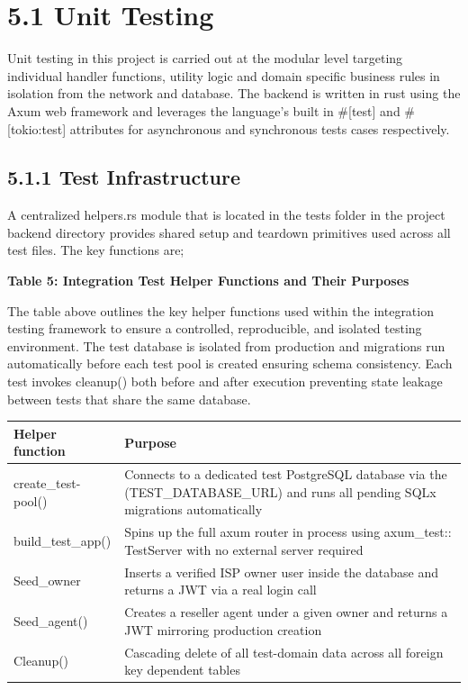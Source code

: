 \documentclass[12pt,a4paper,oneside]{report}
\begin{document}
\section{5.1 Unit Testing}

Unit testing in this project is carried out at the modular level targeting individual handler functions, utility logic and domain specific business rules in isolation from the network and database. The backend is written in rust using the Axum web framework and leverages the language's built in \#[test] and \#[tokio:test] attributes for asynchronous and synchronous tests cases respectively.


\subsection{5.1.1 Test Infrastructure}

A centralized helpers.rs module that is located in the tests folder in the project backend directory provides shared setup and teardown primitives used across all test files. The key functions are;


\textbf{Table 5: Integration Test Helper Functions and Their Purposes}


The table above outlines the key helper functions used within the integration testing framework to ensure a controlled, reproducible, and isolated testing environment. The test database is isolated from production and migrations run automatically before each test pool is created ensuring schema consistency. Each test invokes cleanup() both before and after execution preventing state leakage between tests that share the same database.


\begin{table}[htbp]
  \centering
  {\small
  \begin{tabular}{|p{3.07cm}|p{8.00cm}|}
    \hline
    Helper function & Purpose \\
    \hline
    create\_test-pool() & Connects to a dedicated test PostgreSQL database via the (TEST\_DATABASE\_URL) and runs all pending SQLx migrations automatically \\
    build\_test\_app() & Spins up the full axum router in process using axum\_test:: TestServer with no external server required \\
    Seed\_owner & Inserts a verified ISP owner user inside the database and returns a JWT via a real login call \\
    Seed\_agent() & Creates a reseller agent under a given owner and returns a JWT mirroring production creation \\
    Cleanup() & Cascading delete of all test-domain data  across all foreign key dependent tables \\
    \hline
  \end{tabular}
  }
\end{table}
\end{document}
